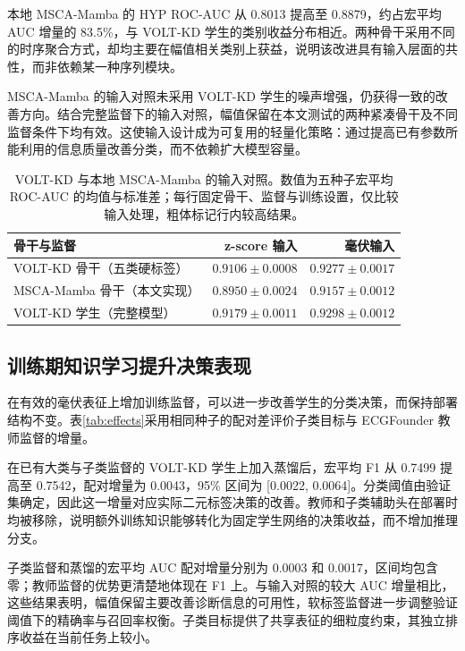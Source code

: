 \documentclass[11pt,a4paper,UTF8,fontset=windows]{ctexart}
\begin{document}
本地 MSCA-Mamba 的 HYP ROC-AUC 从 0.8013 提高至 0.8879，约占宏平均 AUC 增量的 83.5\%，与 VOLT-KD 学生的类别收益分布相近。两种骨干采用不同的时序聚合方式，却均主要在幅值相关类别上获益，说明该改进具有输入层面的共性，而非依赖某一种序列模块。

MSCA-Mamba 的输入对照未采用 VOLT-KD 学生的噪声增强，仍获得一致的改善方向。结合完整监督下的输入对照，幅值保留在本文测试的两种紧凑骨干及不同监督条件下均有效。这使输入设计成为可复用的轻量化策略：通过提高已有参数所能利用的信息质量改善分类，而不依赖扩大模型容量。

\begin{table}[htbp]
\centering\small
\caption{VOLT-KD 与本地 MSCA-Mamba 的输入对照。数值为五种子宏平均 ROC-AUC 的均值与标准差；每行固定骨干、监督与训练设置，仅比较输入处理，粗体标记行内较高结果。}\label{tab:backbones}
\begin{tabularx}{\linewidth}{Yrr}
\toprule
骨干与监督 & z-score 输入 & 毫伏输入 \\
\midrule
VOLT-KD 骨干（五类硬标签） & $0.9106\pm0.0008$ & $\boldsymbol{0.9277\pm0.0017}$ \\
MSCA-Mamba 骨干（本文实现） & $0.8950\pm0.0024$ & $\boldsymbol{0.9157\pm0.0012}$ \\
\midrule
VOLT-KD 学生（完整模型） & $0.9179\pm0.0011$ & $\boldsymbol{0.9298\pm0.0012}$ \\
\bottomrule
\end{tabularx}
\par\vspace{3pt}{\footnotesize 完整 VOLT-KD 同时使用五大类硬标签、诊断子类目标和教师软标签；其两种输入配置采用相同监督。}
\end{table}

\subsection{训练期知识学习提升决策表现}\label{sec:supervision}
在有效的毫伏表征上增加训练监督，可以进一步改善学生的分类决策，而保持部署结构不变。表\ref{tab:effects}采用相同种子的配对差评价子类目标与 ECGFounder 教师监督的增量。

在已有大类与子类监督的 VOLT-KD 学生上加入蒸馏后，宏平均 F1 从 0.7499 提高至 0.7542，配对增量为 0.0043，95\% 区间为 [0.0022, 0.0064]。分类阈值由验证集确定，因此这一增量对应实际二元标签决策的改善。教师和子类辅助头在部署时均被移除，说明额外训练知识能够转化为固定学生网络的决策收益，而不增加推理分支。

子类监督和蒸馏的宏平均 AUC 配对增量分别为 0.0003 和 0.0017，区间均包含零；教师监督的优势更清楚地体现在 F1 上。与输入对照的较大 AUC 增量相比，这些结果表明，幅值保留主要改善诊断信息的可用性，软标签监督进一步调整验证阈值下的精确率与召回率权衡。子类目标提供了共享表征的细粒度约束，其独立排序收益在当前任务上较小。
\end{document}
